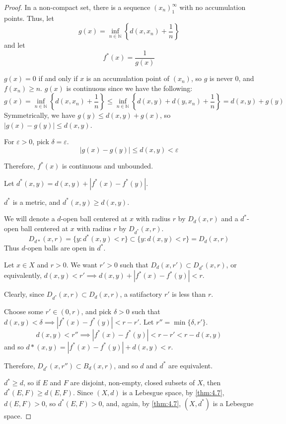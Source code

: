 \documentclass[openany, amssymb, psamsfonts]{amsart}
\let\fullref\autoref
\theoremstyle{definition}
\numberwithin{equation}{section}
\begin{document}
\begin{proof}
  In a non-compact set, there is a sequence $(x_n)_1^\infty$ with no accumulation points. Thus, let $$g(x) = \inf_{n\in \mathbb N} \left\{d(x, x_n) + \frac1{n}\right\}$$ and let $$f^\ast(x) = \frac1{g(x)}$$ 

  $g(x) = 0$ if and only if $x$ is an accumulation point of $(x_n)$, so $g$ is never $0$, and $f(x_n) \ge n$. $g(x)$ is continuous since we have the following:
  \[
    g(x) = \inf_{n \in \mathbb N} \left\{d(x, x_n) + \frac1{n}\right\} \le \inf_{n \in \mathbb N} \left\{d(x,y) + d(y, x_n) + \frac1{n}\right\} = d(x,y) + g(y)
  \]
  Symmetrically, we have $g(y) \le d(x,y) + g(x)$, so $|g(x) - g(y)| \le d(x,y)$. 

  For $\varepsilon > 0$, pick $\delta = \varepsilon$. 
  $$|g(x)-g(y)| \le d(x,y) < \varepsilon$$

  Therefore, $f^\ast(x)$ is continuous and unbounded. 

  Let $d^\ast(x,y) = d(x,y) + |f^\ast(x) - f^\ast(y)|$. 

  $d^\ast$ is a metric, and $d^\ast(x,y) \ge d(x,y)$.  

  We will denote a $d$-open ball centered at $x$ with radius $r$ by $D_d(x,r)$ and a $d^\ast$-open ball centered at $x$ with radius $r$ by $D_{d^\ast}(x,r)$.
  $$D_{d\ast}(x,r) = \{y : d^\ast(x,y) < r\} \subset \{y: d(x,y) < r\} = D_d(x,r)$$ Thus $d$-open balls are open in $d^\ast$. 

  Let $x \in X$ and $r > 0$. We want $r'>0$ such that $D_d(x,r')\subset D_{d^\ast}(x,r)$, or equivalently, $d(x,y) < r' \implies d(x,y) + |f^\ast(x) - f^\ast(y)| < r$. 

  Clearly, since $D_{d^\ast}(x, r) \subset D_d(x,r)$, a satifactory $r'$ is less than $r$. 

  Choose some $r' \in (0, r)$, and pick $\delta > 0$ such that $d(x,y) < \delta \implies |f^\ast(x) - f^\ast(y)| < r - r'$. Let $r'' = \min\{\delta, r'\}$. $$d(x,y) < r'' \implies |f^\ast(x) - f^\ast(y)| < r - r'< r - d(x,y)$$ and so $d\ast(x,y) = |f^\ast(x) - f^\ast(y)| + d(x,y) < r$. 

  Therefore, $D_{d^\ast}(x, r'') \subset B_d(x, r)$, and so $d$ and $d^\ast$ are equivalent. 

  $d^\ast \ge d$, so if $E$ and $F$ are disjoint, non-empty, closed subsets of $X$, then $d^\ast(E, F) \ge d(E, F)$. Since $(X,d)$ is a Lebesgue space, by \fullref{thm:4.7}, $d(E,F) > 0$, so $d^\ast(E,F) > 0$, and, again, by \fullref{thm:4.7}, $(X,d^\ast)$ is a Lebesgue space.
\end{proof}
\end{document}
